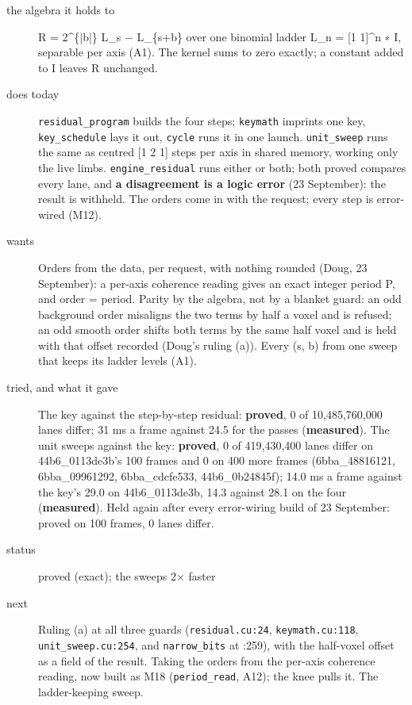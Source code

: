 \begin{description}
\item[{the algebra it holds to}] R = 2\textasciicircum{}\{|b|\} L\_\allowbreak{}s − L\_\allowbreak{}\{s+b\} over one binomial ladder L\_\allowbreak{}n = [1 1]\textasciicircum{}n ∗ I, separable per axis (A1). The kernel sums to zero exactly; a constant added to I leaves R unchanged.
\item[{does today}] \texttt{residual\_\allowbreak{}program} builds the four steps; \texttt{keymath} imprints one key, \texttt{key\_\allowbreak{}schedule} lays it out, \texttt{cycle} runs it in one launch. \texttt{unit\_\allowbreak{}sweep} runs the same as centred [1 2 1] steps per axis in shared memory, working only the live limbs. \texttt{engine\_\allowbreak{}residual} runs either or both; both proved compares every lane, and \textbf{a disagreement is a logic error} (23 September): the result is withheld. The orders come in with the request; every step is error-wired (M12).
\item[{wants}] Orders from the data, per request, with nothing rounded (Doug, 23 September): a per-axis coherence reading gives an exact integer period P, and order = period. Parity by the algebra, not by a blanket guard: an odd background order misaligns the two terms by half a voxel and is refused; an odd smooth order shifts both terms by the same half voxel and is held with that offset recorded (Doug's ruling (a)). Every (s, b) from one sweep that keeps its ladder levels (A1).
\item[{tried, and what it gave}] The key against the step-by-step residual: \textbf{proved}, 0 of 10,485,760,000 lanes differ; 31 ms a frame against 24.5 for the passes (\textbf{measured}). The unit sweeps against the key: \textbf{proved}, 0 of 419,430,400 lanes differ on 44b6\_\allowbreak{}0113de3b's 100 frames and 0 on 400 more frames (6bba\_\allowbreak{}48816121, 6bba\_\allowbreak{}09961292, 6bba\_\allowbreak{}cdcfe533, 44b6\_\allowbreak{}0b24845f); 14.0 ms a frame against the key's 29.0 on 44b6\_\allowbreak{}0113de3b, 14.3 against 28.1 on the four (\textbf{measured}). Held again after every error-wiring build of 23 September: proved on 100 frames, 0 lanes differ.
\item[{status}] proved (exact); the sweeps 2× faster
\item[{next}] Ruling (a) at all three guards (\texttt{residual.\allowbreak{}cu:24}, \texttt{keymath.\allowbreak{}cu:118}, \texttt{unit\_\allowbreak{}sweep.\allowbreak{}cu:254}, and \texttt{narrow\_\allowbreak{}bits} at :259), with the half-voxel offset as a field of the result. Taking the orders from the per-axis coherence reading, now built as M18 (\texttt{period\_\allowbreak{}read}, A12); the knee pulls it. The ladder-keeping sweep.
\end{description}


